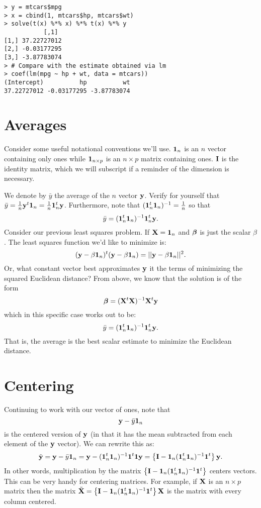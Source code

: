 \begin{verbatim}
> y = mtcars$mpg
> x = cbind(1, mtcars$hp, mtcars$wt)
> solve(t(x) %*% x) %*% t(x) %*% y
           [,1]
[1,] 37.22727012
[2,] -0.03177295
[3,] -3.87783074
> # Compare with the estimate obtained via lm
> coef(lm(mpg ~ hp + wt, data = mtcars))
(Intercept)          hp          wt 
37.22727012 -0.03177295 -3.87783074 
\end{verbatim}



\section{Averages}
Consider some useful notational conventions we'll use. 
$\mathbf{1}_n$ is an  $n$ vector containing only ones while
$\mathbf{1}_{n\times p}$ is an $n\times p$ matrix containing ones.
$\mathbf{I}$ is the identity matrix, which we will subscript if a
reminder of the dimension is necessary.

We denote by $\bar y$ the average of the $n$ vector $\mathbf{y}$.
Verify for yourself that $\bar y = \frac{1}{n} \mathbf{y}^t \mathbf{1}_n = \frac{1}{n} \mathbf{1}_n^t \mathbf{y}$.
Furthermore, note that $(\mathbf{1}_n^t \mathbf{1}_n)^{-1} = \frac{1}{n}$ so that
$$
\bar y = (\mathbf{1}_n^t \mathbf{1}_n)^{-1} \mathbf{1}^t_n \mathbf{y}.
$$
Consider our previous least squares problem. If $\mathbf{X} = \mathbf{1}_n$ and $\boldsymbol{\beta}$ 
is just the scalar $\beta$. The least squares function we'd like to minimize
is:
$$
(\mathbf{y} - \beta \mathbf{1}_n)^t (\mathbf{y} - \beta \mathbf{1}_n) = ||\mathbf{y} - \beta \mathbf{1}_n||^2.
$$
Or, what constant vector best approximates $\mathbf{y}$ it the terms of minimizing the
squared Euclidean distance? From above, we know that the solution is of the form 
$$
\boldsymbol{\beta} = (\mathbf{X}^t \mathbf{X})^{-1} \mathbf{X}^t \mathbf{y}
$$
which in this specific case works out to be:
$$
\bar y = (\mathbf{1}_n^t \mathbf{1}_n)^{-1} \mathbf{1}^t_n \mathbf{y}.
$$
That is, the average is the best scalar estimate to minimize the 
Euclidean distance. 

\section{Centering}

Continuing to work with our vector of ones, note that 
$$
\mathbf{y} - \bar y \mathbf{1}_n
$$
is the centered version of $\mathbf{y}$ (in that it has the mean subtracted from each element of the $\mathbf{y}$ vector).
We can rewrite this as:
$$
\tilde {\mathbf{y}} = \mathbf{y} - \bar y \mathbf{1}_n = \mathbf{y} - (\mathbf{1}_n^t \mathbf{1}_n)^{-1} \mathbf{1}^t \mathbf{1} \mathbf{y}
= \left\{ \mathbf{I} - \mathbf{1}_n (\mathbf{1}_n^t \mathbf{1}_n)^{-1} \mathbf{1}^t \right\} \mathbf{y}.
$$
In other words, multiplication by the matrix $ \left\{ \mathbf{I} - \mathbf{1}_n (\mathbf{1}_n^t \mathbf{1}_n)^{-1} \mathbf{1}^t \right\}$
centers vectors. This can be very handy for centering matrices. For example, if $\mathbf{X}$ is an $n\times p$
matrix then the matrix $\tilde {\mathbf{X}}  = \left\{ \mathbf{I} - \mathbf{1}_n (\mathbf{1}_n^t \mathbf{1}_n)^{-1} \mathbf{1}^t \right\} \mathbf{X}$
is the matrix with every column centered. 

